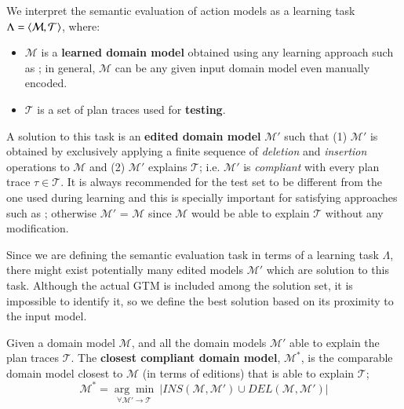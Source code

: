 
We interpret the semantic evaluation of action models as a learning task $\Lambda = {\langle \mathcal{M}, \mathcal{T} \rangle}$, where:

\begin{itemize}
	\item $\mathcal{M}$ is a \textbf{learned domain model} obtained using any learning approach such as \FAMA; in general, $\mathcal{M}$ can be any given input domain model even manually encoded.
	\item$\mathcal{T}$ is a set of plan traces  used for \textbf{testing}.
\end{itemize}


A solution to this task is an \textbf{edited domain model} $\mathcal{M'}$ such that (1) $\mathcal{M'}$ is obtained by exclusively applying a finite sequence of \emph{deletion} and \emph{insertion} operations to $\mathcal{M}$ and (2) $\mathcal{M'}$ explains $\mathcal{T}$; i.e. $\mathcal{M'}$ is {\em compliant} with every plan trace $\tau\in\mathcal{T}$. It is always recommended for the test set to be different from the one used during learning and this is specially important for satisfying approaches such as \FAMA; otherwise $\mathcal{M'}$ = $\mathcal{M}$ since $\mathcal{M}$ would be able to explain $\mathcal{T}$ without any modification.

Since we are defining the semantic evaluation task in terms of a learning task $\Lambda$, there might exist potentially many edited models $\mathcal{M'}$ which are solution to this task. Although the actual GTM is included among the solution set, it is impossible to identify it, so we define the best solution based on its proximity to the input model.

\begin{mydefinition} \label{compliant}
  Given a domain model $\mathcal{M}$, and all the domain models $\mathcal{M'}$ able to explain the plan traces $\mathcal{T}$. The {\bf closest compliant domain model}, $\mathcal{M^*}$, is the comparable domain model closest to $\mathcal{M}$ (in terms of editions) that is able to explain $\mathcal{T}$;
  \[\mathcal{M^*}=\underset{\forall \mathcal{M}' \rightarrow \mathcal{T}}{\arg\min} \ \left| INS(\mathcal{M},\mathcal{M'}) \cup DEL(\mathcal{M},\mathcal{M'}) \right|\]
\end{mydefinition}


